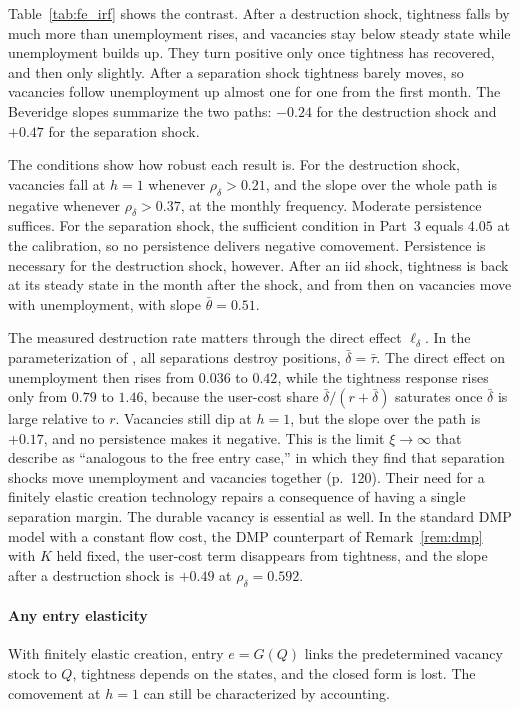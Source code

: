 \documentclass[authoryear, review, 12pt]{elsarticle}
\begin{document}
Table~\ref{tab:fe_irf} shows the contrast. After a destruction shock, tightness falls by
much more than unemployment rises, and vacancies stay below steady state while unemployment
builds up. They turn positive only once tightness has recovered, and then only slightly.
After a separation shock tightness barely moves, so vacancies follow unemployment up almost
one for one from the first month. The Beveridge slopes summarize the two paths: $-0.24$
for the destruction shock and $+0.47$ for the separation shock.

The conditions show how robust each result is. For the destruction shock, vacancies fall
at $h=1$ whenever $\rho_\delta>0.21$, and the slope over the whole path is negative whenever
$\rho_\delta>0.37$, at the monthly frequency. Moderate persistence suffices. For the
separation shock, the sufficient condition in Part~3 equals $4.05$ at the calibration, so no
persistence delivers negative comovement. Persistence is necessary for the destruction shock, however. After an
iid shock, tightness is back at its steady state in the month after the shock, and from
then on vacancies move with unemployment, with slope $\bar\theta=0.51$.

The measured destruction rate matters through the direct effect $\ell_\delta$. In the
parameterization of \citet{coles_2018}, all separations destroy positions,
$\bar\delta=\bar\tau$. The direct effect on unemployment then rises from $0.036$ to $0.42$,
while the tightness response rises only from $0.79$ to $1.46$, because the user-cost share
$\bar\delta/(r+\bar\delta)$ saturates once $\bar\delta$ is large relative to $r$. Vacancies
still dip at $h=1$, but the slope over the path is $+0.17$, and no persistence makes it
negative. This is the limit $\xi\to\infty$ that \citet[p.~125]{coles_2018} describe as
``analogous to the free entry case,'' in which they find that separation shocks move
unemployment and vacancies together (p.~120). Their need for a finitely
elastic creation technology repairs a consequence of having a single separation margin. The
durable vacancy is essential as well. In the standard DMP model with a constant flow cost,
the DMP counterpart of Remark~\ref{rem:dmp} with $K$ held fixed, the user-cost term
disappears from tightness, and the slope after a destruction shock is $+0.49$ at
$\rho_\delta=0.592$.

\paragraph{Any entry elasticity}
With finitely elastic creation, entry $e=G(Q)$ links the predetermined vacancy stock to
$Q$, tightness depends on the states, and the closed form is lost. The comovement at
$h=1$ can still be characterized by accounting.
\end{document}
